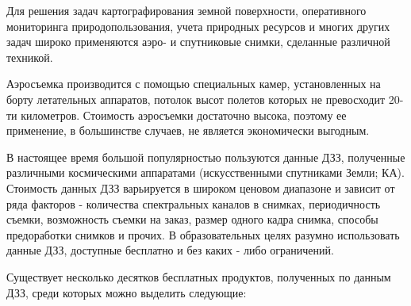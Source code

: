 

Для решения задач картографирования земной поверхности, оперативного мониторинга природопользования, учета природных ресурсов и многих других задач широко применяются аэро- и спутниковые снимки, сделанные различной техникой.

Аэросъемка производится с помощью специальных камер, установленных на борту летательных аппаратов, потолок высот полетов которых не превосходит 20-ти километров. Стоимость аэросъемки достаточно высока, поэтому ее применение, в большинстве случаев, не является экономически выгодным.

В настоящее время большой популярностью пользуются данные ДЗЗ, полученные различными космическими аппаратами (искусственными спутниками Земли; КА). Стоимость данных ДЗЗ варьируется в широком ценовом диапазоне и зависит от ряда факторов - количества спектральных каналов в снимках, периодичность съемки, возможность съемки на заказ, размер одного кадра снимка, способы предоработки снимков и прочих. В образовательных целях разумно использовать данные ДЗЗ, доступные бесплатно и без каких - либо ограничений.

Существует несколько десятков бесплатных продуктов, полученных по данным ДЗЗ, среди которых можно выделить следующие:

